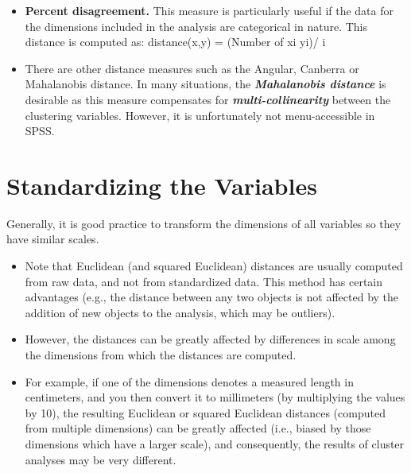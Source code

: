 \documentclass[a4paper,12pt]{report}
\begin{document}
\begin{itemize}
\item \textbf{Percent disagreement.} This measure is particularly useful if the data for the dimensions included in the analysis are categorical in nature. This distance is computed as:
distance(x,y) = (Number of xi  yi)/ i
	\item There are other distance measures such as the Angular, Canberra or Mahalanobis
	distance. In many situations, the \textbf{\textit{Mahalanobis
			distance}} is desirable as this measure compensates for \textbf{\textit{multi-collinearity}}
	between the clustering variables. However, it is unfortunately not menu-accessible
	in SPSS.
\end{itemize}
\newpage
\section{Standardizing the Variables}
\begin{framed}
	{
		\large
		\noindent	Generally, it is good practice to transform the dimensions of all variables so they have similar scales.
	}
\end{framed}
\begin{itemize}
\item Note that Euclidean (and squared Euclidean) distances are usually computed from raw data, and not from standardized data. This method has certain advantages (e.g., the distance between any two objects is not affected by the addition of new objects to the analysis, which may be outliers). 
\item However, the distances can be greatly affected by differences in scale among the dimensions from which the distances are computed. 
\item 
For example, if one of the dimensions denotes a measured length in centimeters, and you then convert it to millimeters (by multiplying the values by 10), the resulting Euclidean or squared Euclidean distances (computed from multiple dimensions) can be greatly affected (i.e., biased by those dimensions which have a larger scale), and consequently, the results of cluster analyses may be very different. 
\end{itemize}
\end{document}
